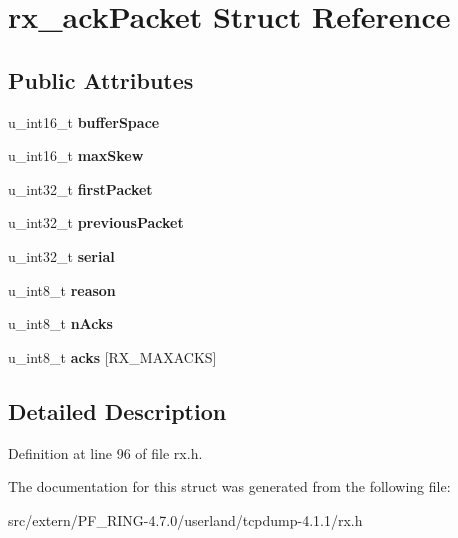 \hypertarget{structrx__ack_packet}{
\section{rx\_\-ackPacket Struct Reference}
\label{structrx__ack_packet}
}
\subsection*{Public Attributes}
\begin{DoxyCompactItemize}
\item 
\hypertarget{structrx__ack_packet_af3e2bd21f980d9164a0e58cf49ea3c27}{
u\_\-int16\_\-t {\bfseries bufferSpace}}
\label{structrx__ack_packet_af3e2bd21f980d9164a0e58cf49ea3c27}

\item 
\hypertarget{structrx__ack_packet_ad86dfa8b4f8ff36856bcab740c39bf9b}{
u\_\-int16\_\-t {\bfseries maxSkew}}
\label{structrx__ack_packet_ad86dfa8b4f8ff36856bcab740c39bf9b}

\item 
\hypertarget{structrx__ack_packet_ad93e5a8ccade7161df5a7b87a575c331}{
u\_\-int32\_\-t {\bfseries firstPacket}}
\label{structrx__ack_packet_ad93e5a8ccade7161df5a7b87a575c331}

\item 
\hypertarget{structrx__ack_packet_a5a0be2afe7b9db78a0ced61923a2dee1}{
u\_\-int32\_\-t {\bfseries previousPacket}}
\label{structrx__ack_packet_a5a0be2afe7b9db78a0ced61923a2dee1}

\item 
\hypertarget{structrx__ack_packet_a79f87f0dd127a865a72b8ea938196ab2}{
u\_\-int32\_\-t {\bfseries serial}}
\label{structrx__ack_packet_a79f87f0dd127a865a72b8ea938196ab2}

\item 
\hypertarget{structrx__ack_packet_a5ef163a8c561a35562a76d155a96b343}{
u\_\-int8\_\-t {\bfseries reason}}
\label{structrx__ack_packet_a5ef163a8c561a35562a76d155a96b343}

\item 
\hypertarget{structrx__ack_packet_ae481c0a1713c7574e369ea642cf73f0a}{
u\_\-int8\_\-t {\bfseries nAcks}}
\label{structrx__ack_packet_ae481c0a1713c7574e369ea642cf73f0a}

\item 
\hypertarget{structrx__ack_packet_a59d2e4aa999a38fb24c7524bcad844bd}{
u\_\-int8\_\-t {\bfseries acks} \mbox{[}RX\_\-MAXACKS\mbox{]}}
\label{structrx__ack_packet_a59d2e4aa999a38fb24c7524bcad844bd}

\end{DoxyCompactItemize}


\subsection{Detailed Description}


Definition at line 96 of file rx.h.



The documentation for this struct was generated from the following file:\begin{DoxyCompactItemize}
\item 
src/extern/PF\_\-RING-\/4.7.0/userland/tcpdump-\/4.1.1/rx.h\end{DoxyCompactItemize}
